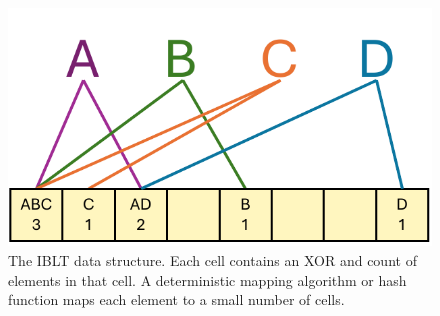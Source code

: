 \begin{figure}[t]
    \centering
    \includegraphics[width=0.5\linewidth]{slides/figures/iblt.pdf}
    \caption{The IBLT data structure. Each cell contains an XOR and count of
     elements in that cell. A deterministic mapping algorithm or hash function
     maps each element to a small number of cells.}
    \label{fig:slides:iblt}
\end{figure}

